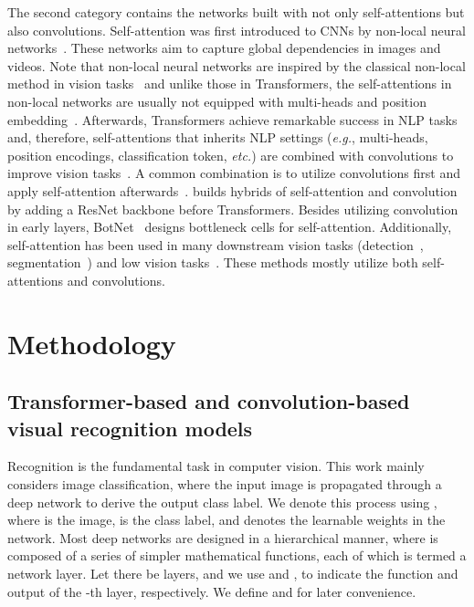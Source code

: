 \documentclass[10pt,twocolumn,letterpaper]{article}
\begin{document}
The second category contains the networks built with not only self-attentions but also convolutions. Self-attention was first introduced to CNNs by non-local neural networks~\cite{wang2018non}. These networks aim to capture global dependencies in images and videos. Note that non-local neural networks are inspired by the classical non-local method in vision tasks~\cite{buades2005non} and unlike those in Transformers, the self-attentions in non-local networks are usually not equipped with multi-heads and position embedding~\cite{wang2018non, cao2019gcnet, li2020neural}. Afterwards, Transformers achieve remarkable success in NLP tasks~\cite{devlin2018bert,radford2018improving} and, therefore, self-attentions that inherits NLP settings (\textit{e.g.}, multi-heads, position encodings, classification token, \textit{etc.}) are combined with convolutions to improve vision tasks~\cite{ramachandran2019stand, dosovitskiy2020image}. A common combination is to utilize convolutions first and apply self-attention afterwards~\cite{dosovitskiy2020image, srinivas2021bottleneck}. \cite{dosovitskiy2020image} builds hybrids of self-attention and convolution by adding a ResNet backbone before Transformers.  Besides utilizing convolution in early layers, BotNet~\cite{srinivas2021bottleneck} designs bottleneck cells for self-attention. Additionally, self-attention has been used in many downstream vision tasks (detection~\cite{carion2020end}, segmentation~\cite{chen2021transunet}) and low vision tasks~\cite{chen2020pre}. These methods mostly utilize both self-attentions and convolutions.

\section{Methodology}
\label{methodology}

\subsection{Transformer-based and convolution-based visual recognition models}
\label{methodology:baselines}

Recognition is the fundamental task in computer vision. This work mainly considers image classification, where the input image is propagated through a deep network to derive the output class label. We denote this process using , where  is the image,  is the class label, and  denotes the learnable weights in the network. Most deep networks are designed in a hierarchical manner, where  is composed of a series of simpler mathematical functions, each of which is termed a network layer. Let there be  layers, and we use  and ,  to indicate the function and output of the -th layer, respectively. We define  and  for later convenience.
\end{document}
